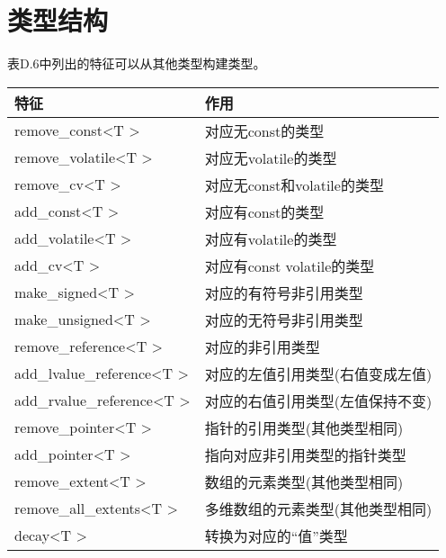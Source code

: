 \section{类型结构}

表D.6中列出的特征可以从其他类型构建类型。

\begin{table}[H]
	\begin{center}
	\begin{tabular}{l|l}
		\hline
		\textbf{特征}                                    & \textbf{作用}                                                \\ \hline
		remove\_const\textless{}T \textgreater{}          & 对应无const的类型                               \\ \hline
		remove\_volatile\textless{}T \textgreater{}       & 对应无volatile的类型                            \\ \hline
		remove\_cv\textless{}T \textgreater{}             & 对应无const和volatile的类型                  \\ \hline
		add\_const\textless{}T \textgreater{}             & 对应有const的类型                                       \\ \hline
		add\_volatile\textless{}T \textgreater{}          & 对应有volatile的类型                                    \\ \hline
		add\_cv\textless{}T \textgreater{}                & 对应有const volatile的类型                              \\ \hline
		make\_signed\textless{}T \textgreater{}           & 对应的有符号非引用类型                         \\ \hline
		make\_unsigned\textless{}T \textgreater{}         & 对应的无符号非引用类型                       \\ \hline
		remove\_reference\textless{}T \textgreater{}      & 对应的非引用类型                                \\ \hline
		add\_lvalue\_reference\textless{}T \textgreater{} & 对应的左值引用类型(右值变成左值)   \\ \hline
		add\_rvalue\_reference\textless{}T \textgreater{} & 对应的右值引用类型(左值保持不变)   \\ \hline
		remove\_pointer\textless{}T \textgreater{}        & 指针的引用类型(其他类型相同)               \\ \hline
		add\_pointer\textless{}T \textgreater{}           & 指向对应非引用类型的指针类型             \\ \hline
		remove\_extent\textless{}T \textgreater{}         & 数组的元素类型(其他类型相同)                 \\ \hline
		remove\_all\_extents\textless{}T \textgreater{}   & 多维数组的元素类型(其他类型相同) \\ \hline
		decay\textless{}T \textgreater{}                  & 转换为对应的“值”类型                     \\ \hline
	\end{tabular}
	\end{center}
\end{table}

